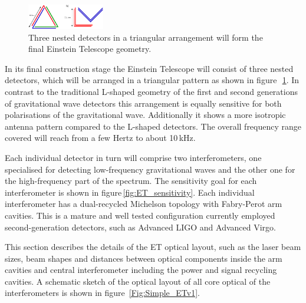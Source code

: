 \FloatBarrier
\label{sec:optlayout}

\begin{figure}
	\centering
	\includegraphics[width=0.3\textwidth]{Intro/Intro_Figures/NestedDetectors.pdf}
	\caption{Three nested detectors in a triangular arrangement will 
	form the final Einstein Telescope geometry.}
	\label{fig:NestedDetectors}
\end{figure}
In its final construction stage the Einstein Telescope will consist of three
nested detectors, which will be arranged in a triangular pattern as shown in
figure\,~\ref{fig:NestedDetectors}. In contrast to the traditional L-shaped
geometry of the first and second generations of gravitational wave detectors
this arrangement is equally sensitive for both polarisations of the
gravitational wave. Additionally it shows a more isotropic antenna pattern
compared to the L-shaped detectors.%
The
overall frequency range covered will reach from a few Hertz to about 10\,kHz.

Each individual detector in turn will comprise two interferometers, one
specialised for detecting low-frequency gravitational waves and the other one
for the high-frequency part of the spectrum. The sensitivity goal for each interferometer is
shown in figure\,\ref{fig:ET_sensitivity}. %
Each individual interferometer has a  dual-recycled Michelson topology with
Fabry-Perot arm cavities. This is a mature and well tested configuration
currently employed  second-generation detectors, such as Advanced LIGO and
Advanced Virgo. 

This section describes the details of the ET optical layout, such as the laser
beam sizes, beam shapes and distances between optical components inside the arm
cavities and central interferometer including the power and signal recycling
cavities. A schematic sketch of the optical layout of all core optical of the
interferometers is shown in figure~\ref{Fig:Simple_ETv1}. 


